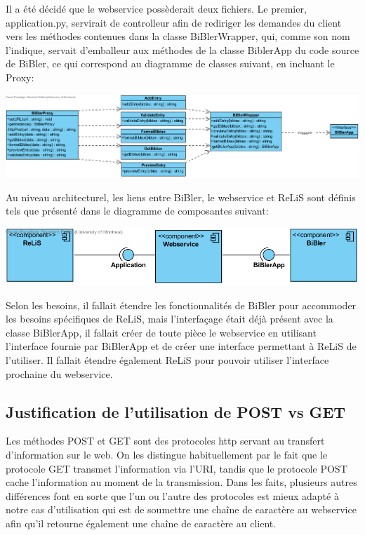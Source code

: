 \documentclass[12pt,titlepage]{article}
\begin{document}
Il a été décidé que le webservice possèderait deux fichiers. Le premier, application.py, servirait de controlleur afin de rediriger les demandes du client vers les méthodes contenues dans la classe BiBlerWrapper, qui, comme son nom l'indique, servait d'emballeur aux méthodes de la classe BiblerApp du code source de BiBler, ce qui correspond au diagramme de classes suivant, en incluant le Proxy:


\includegraphics[width=\textwidth,height=\textheight,keepaspectratio]{ClassDiagram.png}


Au niveau architecturel, les liens entre BiBler, le webservice et ReLiS sont définis tels que présenté dans le diagramme de composantes suivant:

\includegraphics{ComponentDiagram.png}

Selon les besoins, il fallait étendre les fonctionnalités de BiBler pour accommoder les besoins spécifiques de ReLiS, mais l'interfaçage était déjà présent avec la classe BiBlerApp, il fallait créer de toute pièce le webservice en utilisant l'interface fournie par BiBlerApp et de créer une interface permettant à ReLiS de l'utiliser. Il fallait étendre également ReLiS pour pouvoir utiliser l'interface prochaine du webservice. \newline



\subsection{Justification de l'utilisation de POST vs GET}
Les méthodes POST et GET sont des protocoles http servant au transfert d'information sur le web. On les distingue habituellement par le fait que le protocole GET transmet l'information via l'URI, tandis que le protocole POST cache l'information au moment de la transmission. Dans les faits, plusieurs autres différences font en sorte que l'un ou l'autre des protocoles est mieux adapté à notre cas d'utilisation qui est de soumettre une chaîne de caractère au webservice afin qu'il retourne également une chaîne de caractère au client.\newline
\end{document}
